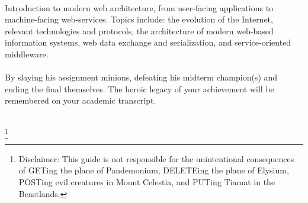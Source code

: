 \documentclass[letterpaper,10pt,twoside,twocolumn,openany]{book}
\begin{document}
\frontmatter                           
\begin{titlepage}
  ~
  \newpage
  
  \begin{center}


    \large
    \vspace*{\fill}
    Introduction to modern web architecture, from user-facing applications to machine-facing web-services. Topics include: the evolution of the Internet, relevant technologies and protocols, the architecture of modern web-based information systems, web data exchange and serialization, and service-oriented middleware. 
    \\~\\
    By slaying his assignment minions, defeating his midterm champion(s) and ending the final themselves. The heroic legacy of your achievement will be remembered on your academic transcript.
    \\~\\
    \vspace*{\fill}

  \end{center}
  \let\thefootnote\relax\footnote{Disclaimer: This guide is not responsible for the unintentional consequences of GETing the plane of Pandemonium, DELETEing the plane of Elysium, POSTing evil creatures in Mount Celestia, and PUTing Tiamat in the Beastlands.}
\end{titlepage}
\tableofcontents
\mainmatter
  
  
  
  
  
  
  
  
 
 
 
 
 

  
  
\end{document}
